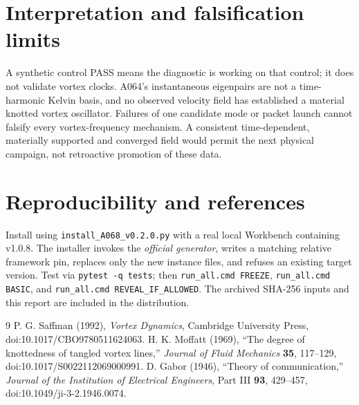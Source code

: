 \documentclass[11pt,a4paper]{article}
\begin{document}
\section{Interpretation and falsification limits}
A synthetic control PASS means the diagnostic is working on that control; it does not validate vortex clocks. A064's instantaneous eigenpairs are not a time-harmonic Kelvin basis, and no observed velocity field has established a material knotted vortex oscillator. Failures of one candidate mode or packet launch cannot falsify every vortex-frequency mechanism. A consistent time-dependent, materially supported and converged field would permit the next physical campaign, not retroactive promotion of these data.

\section{Reproducibility and references}
Install using \texttt{install\_A068\_v0.2.0.py} with a real local Workbench containing v1.0.8. The installer invokes the \emph{official generator}, writes a matching relative framework pin, replaces only the new instance files, and refuses an existing target version. Test via \texttt{pytest -q tests}; then \texttt{run\_all.cmd FREEZE}, \texttt{run\_all.cmd BASIC}, and \texttt{run\_all.cmd REVEAL\_IF\_ALLOWED}. The archived SHA-256 inputs and this report are included in the distribution.

\begin{thebibliography}{9}
 P. G. Saffman (1992), \emph{Vortex Dynamics}, Cambridge University Press, doi:10.1017/CBO9780511624063.
 H. K. Moffatt (1969), ``The degree of knottedness of tangled vortex lines,'' \emph{Journal of Fluid Mechanics} \textbf{35}, 117--129, doi:10.1017/S0022112069000991.
 D. Gabor (1946), ``Theory of communication,'' \emph{Journal of the Institution of Electrical Engineers}, Part III \textbf{93}, 429--457, doi:10.1049/ji-3-2.1946.0074.
\end{thebibliography}
\end{document}
